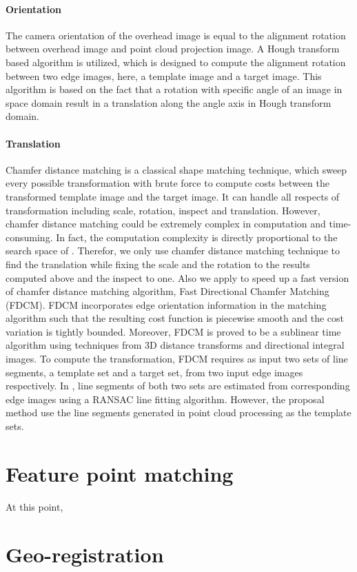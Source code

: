 \paragraph{Orientation}The camera orientation of the overhead image is equal to the alignment rotation between overhead image and point cloud projection image. A Hough transform based algorithm \cite{Censi2005} is utilized, which is designed to compute the alignment rotation between two edge images, here, a template image and a target image. This algorithm is based on the fact that  a rotation with specific angle of an image in space domain result in a translation along the angle axis in Hough transform domain.
%
\paragraph{Translation} 
Chamfer distance matching is a classical shape matching technique, which sweep every possible transformation with brute force to compute costs between the transformed template image and the target image. 
It can handle all respects of transformation including scale, rotation, inspect and translation. However, chamfer distance matching could be extremely complex in computation and time-consuming. 
In fact, the computation complexity is directly proportional to the search space of . 
Therefor, we only use chamfer distance matching technique to find the translation while fixing the scale and the rotation to the results computed above and the inspect to one. Also we apply to speed up a fast version of chamfer distance matching algorithm, Fast Directional Chamfer Matching (FDCM)\cite{FDCM}. 
FDCM incorporates edge orientation information in the matching algorithm such that the resulting cost function is piecewise smooth and the cost variation is tightly bounded. %
Moreover, FDCM is proved to be a sublinear time algorithm using techniques from 3D distance transforms and directional integral images.  %
To compute the transformation, FDCM requires as input two sets of line segments, a template set and a target set, from two input edge images respectively. In \cite{FDCM}, line segments of both two sets are estimated from corresponding edge images using a RANSAC line fitting algorithm. However, the proposal method use the line segments generated in point cloud processing as the template sets.
%
\section{Feature point matching}
At this point, 
%
\section{Geo-registration} \label{sct:geo-registration}
%